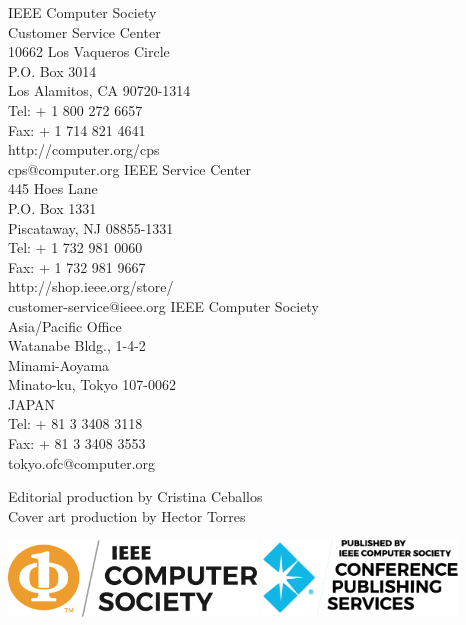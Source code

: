 \documentclass[12pt,twosides]{book}
\begin{document}
\begin{center}
\begin{multicols}{3}
IEEE Computer Society\\
Customer Service Center\\
10662 Los Vaqueros Circle\\
P.O. Box 3014\\
Los Alamitos, CA 90720-1314\\
Tel: + 1 800 272 6657\\
Fax: + 1 714 821 4641\\
http://computer.org/cps\\
cps@computer.org
\columnbreak
IEEE Service Center\\
445 Hoes Lane\\
P.O. Box 1331\\
Piscataway, NJ 08855-1331\\
Tel: + 1 732 981 0060\\
Fax: + 1 732 981 9667\\
http://shop.ieee.org/store/\\
customer-service@ieee.org
\columnbreak
IEEE Computer Society\\
Asia/Pacific Office\\
Watanabe Bldg., 1-4-2\\
Minami-Aoyama\\
Minato-ku, Tokyo 107-0062\\
JAPAN\\
Tel: + 81 3 3408 3118\\
Fax: + 81 3 3408 3553\\
tokyo.ofc@computer.org
\end{multicols}
\end{center}

\begin{center}
Editorial production by Cristina Ceballos\\
Cover art production by Hector Torres
\end{center}

\begin{center}
\begin{multicols}{2}
\includegraphics[height=0.8in]{../images/ieee-cs-logo}
\columnbreak
\includegraphics[height=0.8in]{../images/ieee-cps-logo}
\end{multicols}
\end{center}
\end{document}
